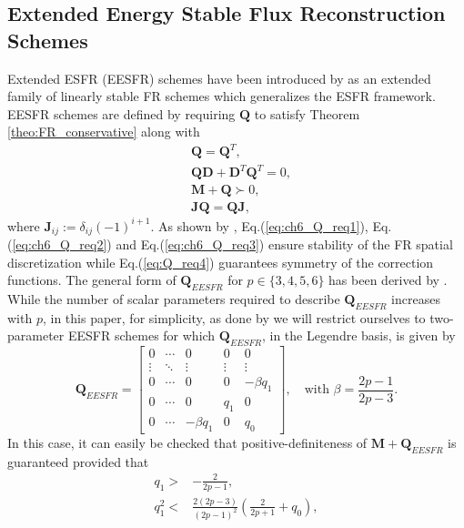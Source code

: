 \documentclass[preprint,12pt]{elsarticle}
\begin{document}
\subsection{Extended Energy Stable Flux Reconstruction Schemes}
Extended ESFR (EESFR) schemes have been introduced by \cite{vincent2015extended} as an extended family of linearly stable FR schemes which generalizes the ESFR framework. EESFR schemes are defined by requiring $\mathbf{Q}$ to satisfy Theorem \ref{theo:FR_conservative} along with
\begin{align}
    &\mathbf{Q} = \mathbf{Q}^T,
    \label{eq:ch6_Q_req1}\\
    &\mathbf{Q}{}\mathbf{D} + \mathbf{D}^T\mathbf{Q}^T = 0,
    \label{eq:ch6_Q_req2}\\
    &\mathbf{M} + \mathbf{Q} \succ 0,
    \label{eq:ch6_Q_req3} \\
    & \mathbf{J} \mathbf{Q} = \mathbf{Q} \mathbf{J},
    \label{eq:Q_req4}
\end{align}
where $\mathbf{J}_{ij} := \delta_{ij}(-1)^{i+1}$. As shown by \cite{vincent2015extended}, Eq.(\ref{eq:ch6_Q_req1}), Eq.(\ref{eq:ch6_Q_req2}) and Eq.(\ref{eq:ch6_Q_req3}) ensure stability of the FR spatial discretization while Eq.(\ref{eq:Q_req4}) guarantees symmetry of the correction functions. The general form of $\mathbf{Q}_{EESFR}$ for $p \in \{3,4,5,6\}$ has been derived by \cite{vincent2015extended}. While the number of scalar parameters required to describe $\mathbf{Q}_{EESFR}$ increases with $p$, in this paper, for simplicity, as done by \cite{vermeire2016properties} we will restrict ourselves to two-parameter EESFR schemes for which $\mathbf{Q}_{EESFR}$, in the Legendre basis, is given by
\begin{equation}
    \mathbf{Q}_{EESFR}
    =
    \begin{bmatrix}
        0 & \cdots & 0 & 0 &0 \\
        \vdots & \ddots & \vdots & \vdots & \vdots \\
        0 & \cdots & 0 & 0 & -\beta q_1 \\
        0 & \cdots & 0 & q_1 & 0 \\
        0 & \cdots & -\beta q_1 & 0 & q_0
    \end{bmatrix},
    \quad
    \text{with }
    \beta = \frac{2p-1}{2p - 3}.
    \label{eq:ch6_Q}
\end{equation}
In this case, it can easily be checked that positive-definiteness of $\mathbf{M} + \mathbf{Q}_{EESFR}$ is guaranteed provided that
\begin{align}
    q_{1} >& -\frac{2}{2p-1}, \label{eq:ch6_stability_req1} \\
    q_1^2 <& \frac{2(2p-3)}{(2p-1)^2}\left(\frac{2}{2p+1}+q_0\right) \label{eq:ch6_stability_req2},
\end{align}
\end{document}
